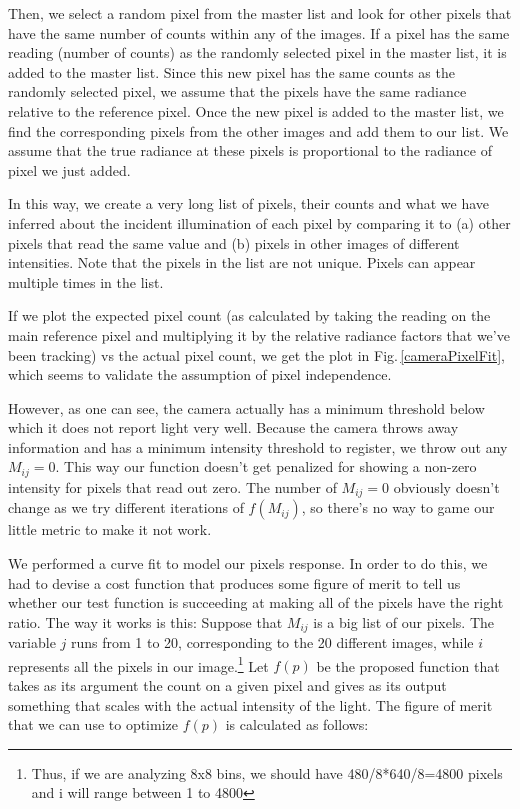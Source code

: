 Then, we select a random pixel from the master list and look for other pixels that have the same number of counts within any of the images. If a pixel has the same reading (number of counts) as the randomly selected pixel in the master list, it is added to the master list. Since this new pixel has the same counts as the randomly selected pixel, we assume that the pixels have the same radiance relative to the reference pixel. Once the new pixel is added to the master list, we find the corresponding pixels from the other images and add them to our list. We assume that the true radiance at these pixels is proportional to the radiance of pixel we just added. 

In this way, we create a very long list of pixels, their counts and what we have inferred about the incident illumination of each pixel by comparing it to (a) other pixels that read the same value and (b) pixels in other images of different intensities. Note that the pixels in the list are not unique. Pixels can appear multiple times in the list.

If we plot the expected pixel count (as calculated by taking the reading on the main reference pixel and multiplying it by the relative radiance factors that we've been tracking) vs the actual pixel count, we get the plot in Fig.\,\ref{cameraPixelFit}, which seems to validate the assumption of pixel independence.

However, as one can see, the camera actually has a minimum threshold below which it does not report light very well. Because the camera throws away information and has a minimum intensity threshold to register, we throw out any $M_{i j}=0$. This way our function doesn't get penalized for showing a non-zero intensity for pixels that read out zero. The number of $M_{i j}=0$ obviously doesn't change as we try different iterations of $f(M_{ij})$, so there's no way to game our little metric to make it not work.

We performed a curve fit to model our pixels response. In order to do this, we had to devise a cost function that produces some figure of merit to tell us whether our test function is succeeding at making all of the pixels have the right ratio. The way it works is this: Suppose that $M_{i j}$ is a big list of our pixels. The variable $j$ runs from 1 to 20, corresponding to the 20 different images, while $i$ represents all the pixels in our image.\footnote{Thus, if we are analyzing 8x8 bins, we should have 480/8*640/8=4800 pixels and i will range between 1 to 4800} Let $f(p)$ be the proposed function that takes as its argument the count on a given pixel and gives as its output something that scales with the actual intensity of the light. The figure of merit that we can use to optimize $f(p)$ is calculated as follows: 

